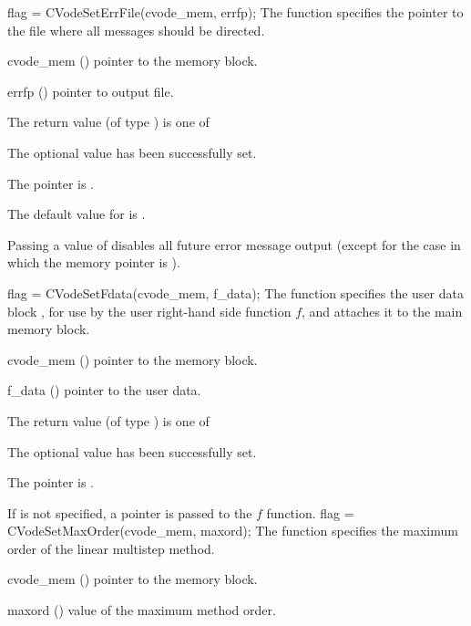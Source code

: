 {
flag = CVodeSetErrFile(cvode\_mem, errfp);
}
{
  The function  specifies the pointer to the file
  where all {\cvode} messages should be directed.
}
{
  \begin{args}
  \item[cvode\_mem] ()
    pointer to the {\cvode} memory block.
  \item[errfp] ()
    pointer to output file.
  \end{args}
}
{
  The return value  (of type ) is one of
  \begin{args}
  \item[\Id{CV\_SUCCESS}] 
    The optional value has been successfully set.
  \item[\Id{CV\_MEM\_NULL}]
    The  pointer is .
  \end{args}
}
{
  The default value for  is . 

  Passing a value of  disables all future error message output
  (except for the case in which the {\cvode} memory pointer is ).
}
{
  flag = CVodeSetFdata(cvode\_mem, f\_data);
}
{
  The function  specifies the user data block ,
  for use by the user right-hand side function $f$, and attaches it to the main 
  {\cvode} memory block.
}
{
  \begin{args}
  \item[cvode\_mem] ()
    pointer to the {\cvode} memory block.
  \item[f\_data] ()
    pointer to the user data.
  \end{args}
}
{
  The return value  (of type ) is one of
  \begin{args}
  \item[\Id{CV\_SUCCESS}] 
    The optional value has been successfully set.
  \item[\Id{CV\_MEM\_NULL}]
    The  pointer is .
  \end{args}
}
{
  If  is not specified, a  pointer is
  passed to the $f$ function.
}
{
flag = CVodeSetMaxOrder(cvode\_mem, maxord);
}
{
  The function  specifies the maximum order of the 
  linear multistep method.
}
{
  \begin{args}
  \item[cvode\_mem] ()
    pointer to the {\cvode} memory block.
  \item[maxord] ()
    value of the maximum method order.
  \end{args}
}
